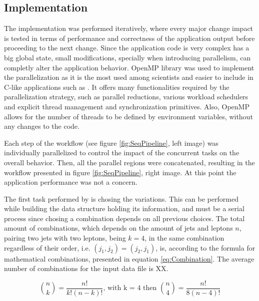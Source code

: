 \subsection{Implementation}
\label{SharedMemImplementation}

The implementation was performed iteratively, where every major change impact is tested in terms of performance and correctness of the application output before proceeding to the next change. Since the application code is very complex has a big global state, small modifications, specially when introducing parallelism, can completly alter the application behavior. OpenMP library was used to implement the parallelization as it is the most used among scientists and easier to include in C-like applications such as \tth. It offers many functionalities required by the parallelization strategy, such as parallel reductions, various workload schedulers and explicit thread management and synchronization primitives. Also, OpenMP allows for the number of threads to be defined by environment variables, without any changes to the code.

Each step of the \ttDilepKinFit workflow (see figure \ref{fig:SeqPipeline}, left image) was individually parallelized to control the impact of the concurrent tasks on the overall behavior. Then, all the parallel regions were concatenated, resulting in the workflow presented in figure \ref{fig:SeqPipeline}, right image. At this point the application performance was not a concern.

The first task performed by \ttDilepKinFit is chosing the variations. This can be performed while building the data structure holding its information, and must be a serial process since chosing a combination depends on all previous choices. The total amount of combinations, which depends on the amount of jets and leptons $n$, pairing two jets with two leptons, being $k = 4$, in the same combination regardless of their order, i.e. $(j_1, j_2) = (j_2, j_1)$, is, according to the formula for mathematical combinations, presented in equation \ref{eq:Combination}. The average number of combinations for the input data file is XX.

\begin{center}
	\begin{equation}
		\binom{n}{k} = \frac{n!}{k!(n - k)!} \mbox{, with k = 4 then } \binom{n}{4} = \frac{n!}{8(n - 4)!}
		\label{eq:Combination}
	\end{equation}
\end{center}


